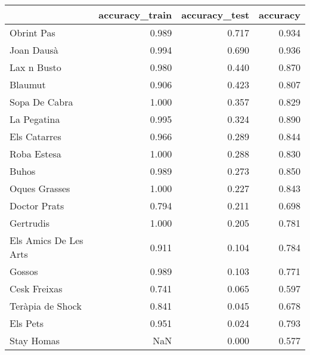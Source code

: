 \begin{tabular}{lrrr}
\toprule
{} &  accuracy\_train &  accuracy\_test &  accuracy \\
\midrule
Obrint Pas            &           0.989 &          0.717 &     0.934 \\
Joan Dausà            &           0.994 &          0.690 &     0.936 \\
Lax n Busto           &           0.980 &          0.440 &     0.870 \\
Blaumut               &           0.906 &          0.423 &     0.807 \\
Sopa De Cabra         &           1.000 &          0.357 &     0.829 \\
La Pegatina           &           0.995 &          0.324 &     0.890 \\
Els Catarres          &           0.966 &          0.289 &     0.844 \\
Roba Estesa           &           1.000 &          0.288 &     0.830 \\
Buhos                 &           0.989 &          0.273 &     0.850 \\
Oques Grasses         &           1.000 &          0.227 &     0.843 \\
Doctor Prats          &           0.794 &          0.211 &     0.698 \\
Gertrudis             &           1.000 &          0.205 &     0.781 \\
Els Amics De Les Arts &           0.911 &          0.104 &     0.784 \\
Gossos                &           0.989 &          0.103 &     0.771 \\
Cesk Freixas          &           0.741 &          0.065 &     0.597 \\
Teràpia de Shock      &           0.841 &          0.045 &     0.678 \\
Els Pets              &           0.951 &          0.024 &     0.793 \\
Stay Homas            &             NaN &          0.000 &     0.577 \\
\bottomrule
\end{tabular}
